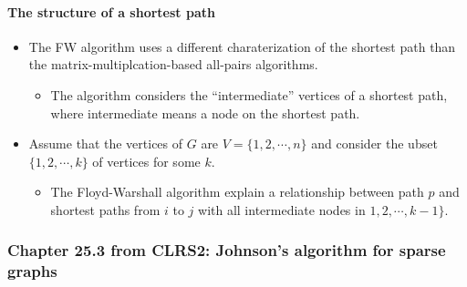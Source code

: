 \documentclass[a4paper,11pt]{article}
\begin{document}
\paragraph{The structure of a shortest
path}\label{the-structure-of-a-shortest-path}

\begin{itemize}
\itemsep1pt\parskip0pt
\item
  The FW algorithm uses a different charaterization of the shortest path
  than the matrix-multiplcation-based all-pairs algorithms.

  \begin{itemize}
  \itemsep1pt\parskip0pt
  \item
    The algorithm considers the ``intermediate'' vertices of a shortest
    path, where intermediate means a node on the shortest path.
  \end{itemize}
\item
  Assume that the vertices of $G$ are
  $V = \lbrace 1, 2, \cdots, n \rbrace$ and consider the ubset
  $\lbrace 1, 2, \cdots, k \rbrace$ of vertices for some $k$.

  \begin{itemize}
  \itemsep1pt\parskip0pt
  \item
    The Floyd-Warshall algorithm explain a relationship between path $p$
    and shortest paths from $i$ to $j$ with all intermediate nodes in
    $1, 2, \cdots, k - 1 \rbrace$.
  \end{itemize}
\end{itemize}

\subsubsection{Chapter 25.3 from CLRS2: Johnson's algorithm for sparse
graphs}\label{chapter-25.3-from-clrs2-johnsons-algorithm-for-sparse-graphs}
\end{document}
